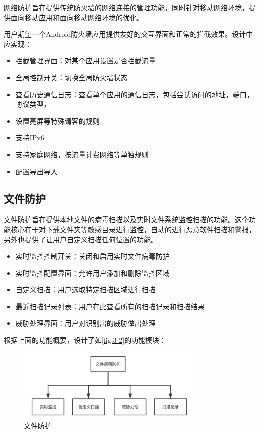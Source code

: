 \documentclass[format=final, language=chinese, degree=fyp]{hustthesis}
\begin{document}

网络防护旨在提供传统防火墙的网络连接的管理功能，同时针对移动网络环境，提供面向移动应用和面向移动网络环境的优化。

用户期望一个Android防火墙应用提供友好的交互界面和正常的拦截效果。设计中应实现：
\begin{itemize}
    \item 拦截管理界面：对某个应用设置是否拦截流量
    \item 全局控制开关：切换全局防火墙状态
    \item 查看历史通信日志：查看单个应用的通信日志，包括尝试访问的地址，端口，协议类型，
    \item 设置亮屏等特殊请客的规则
    \item 支持IPv6
    \item 支持家庭网络，按流量计费网络等单独规则
    \item 配置导出导入
\end{itemize}


\subsection{文件防护}

文件防护旨在提供本地文件的病毒扫描以及实时文件系统监控扫描的功能。这个功能核心在于对下载文件夹等敏感目录进行监控，自动的进行恶意软件扫描和警报，另外也提供了让用户自定义扫描任何位置的功能。

\begin{itemize}
    \item 实时监控控制开关：关闭和启用实时文件病毒防护
    \item 实时监控配置界面：允许用户添加和删除监控区域
    \item 自定义扫描：用户选取特定扫描区域进行扫描
    \item 最近扫描记录列表：用户在此查看所有的扫描记录和扫描结果
    \item 威胁处理界面：用户对识别出的威胁做出处理
\end{itemize}

根据上面的功能概要，设计了如\autoref{fig:3-2}的功能模块：
\begin{figure}[!h]
\centering
\includegraphics[width=0.8\textwidth]{function_2.png}
\caption{文件防护}\label{fig:3-2}
\end{figure}
\end{document}
